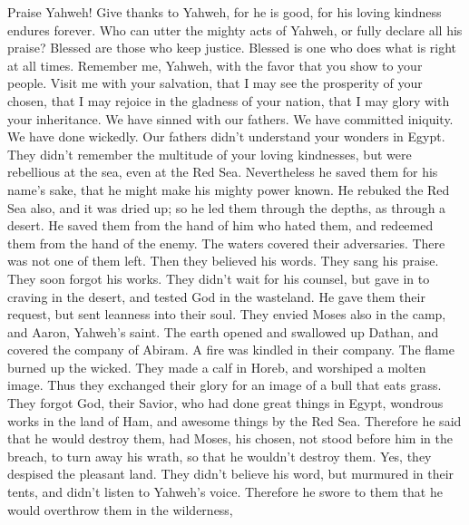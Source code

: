  Praise Yahweh! Give thanks to Yahweh, for he is good, for
his loving kindness endures forever.  Who can utter the
mighty acts of Yahweh, or fully declare all his praise? 
Blessed are those who keep justice. Blessed is one who does what is
right at all times.  Remember me, Yahweh, with the favor
that you show to your people. Visit me with your salvation,
 that I may see the prosperity of your chosen, that I may
rejoice in the gladness of your nation, that I may glory with your
inheritance.  We have sinned with our fathers. We have
committed iniquity. We have done wickedly.  Our fathers
didn't understand your wonders in Egypt. They didn't remember the
multitude of your loving kindnesses, but were rebellious at the sea,
even at the Red Sea.  Nevertheless he saved them for his
name's sake, that he might make his mighty power known. 
He rebuked the Red Sea also, and it was dried up; so he led them through
the depths, as through a desert.  He saved them from the
hand of him who hated them, and redeemed them from the hand of the
enemy.  The waters covered their adversaries. There was
not one of them left.  Then they believed his words. They
sang his praise.  They soon forgot his works. They didn't
wait for his counsel,  but gave in to craving in the
desert, and tested God in the wasteland.  He gave them
their request, but sent leanness into their soul.  They
envied Moses also in the camp, and Aaron, Yahweh's saint.
 The earth opened and swallowed up Dathan, and covered
the company of Abiram.  A fire was kindled in their
company. The flame burned up the wicked.  They made a
calf in Horeb, and worshiped a molten image.  Thus they
exchanged their glory for an image of a bull that eats grass.
 They forgot God, their Savior, who had done great things
in Egypt,  wondrous works in the land of Ham, and awesome
things by the Red Sea.  Therefore he said that he would
destroy them, had Moses, his chosen, not stood before him in the breach,
to turn away his wrath, so that he wouldn't destroy them.
 Yes, they despised the pleasant land. They didn't
believe his word,  but murmured in their tents, and
didn't listen to Yahweh's voice.  Therefore he swore to
them that he would overthrow them in the wilderness, 
